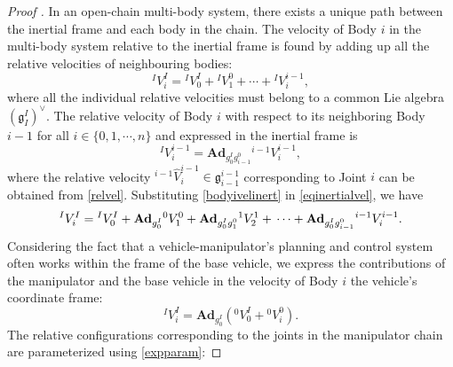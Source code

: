\documentclass[lettersize,journal]{IEEEtran}
\def \g  {\mathfrak{g}}
\def \Ad {\textbf{Ad}}
\theoremstyle{remark}
\begin{document}
\begin{proof}[Proof ] In an open-chain multi-body system, there exists a unique path between the inertial frame and each body in the chain. The velocity of Body $i$ in the multi-body system relative to the inertial frame is found by adding up all the relative velocities of neighbouring bodies:
\begin{equation}
    ^IV^I_i={}^IV_{0}^I+{}^IV_{1}^{0}+\cdots+{}^IV_{i}^{i-1}, \label{eqinertialvel}
\end{equation}
where all the individual relative velocities must belong to a common Lie algebra $(\g^I_I)^\vee$.
The relative velocity of Body $i$ with respect to its neighboring Body $i-1$ for all $i \in \{0,1,\cdots,n\}$ and expressed in the inertial frame is
\begin{equation}
    {}^{I}V_i^{i-1}=\Ad_{g^{I}_0 g_{i-1}^0}{}^{i-1}V_i^{i-1},
    \label{bodyivelinert}
\end{equation}
where the relative velocity ${}^{i-1}\hat{V}_i^{i-1} \in \g^{i-1}_{i-1}$ corresponding to Joint $i$ can be obtained from \eqref{relvel}.
Substituting \eqref{bodyivelinert} in \eqref{eqinertialvel}, we have
\begin{equation*}
    {}^IV^I_i={}^IV_{0}^I+\Ad_{g^I_0}{}^0V_{1}^{0}+\Ad_{g^I_0g^0_1}{}^1V_{2}^{1}+\\
    \cdots+\Ad_{g^I_0g^0_{i-1}}{}^{i-1}V_{i}^{i-1}. \label{eq23}
\end{equation*}
Considering the fact that a vehicle-manipulator's planning and control system often works within the frame of the base vehicle, we express the contributions of the manipulator and the base vehicle in the velocity of Body $i$ the vehicle's coordinate frame:
\begin{equation}
    ^IV_i^{I}=\Ad_{g^I_0}({}^0{V}^I_0+{}^0V^0_i).\label{velocitytemp}
\end{equation}
The relative configurations corresponding to the joints in the manipulator chain are parameterized using \eqref{expparam}:

\end{proof}
\end{document}
